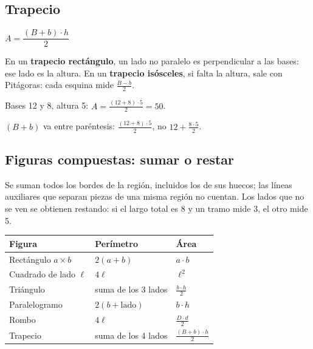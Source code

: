 \subsection{Trapecio}
\begin{clave}[Trapecio] $A = \dfrac{(B + b) \cdot h}{2}$\end{clave}
En un \textbf{trapecio rectángulo}, un lado no paralelo es perpendicular a las bases: ese lado es la altura. En un \textbf{trapecio isósceles}, si falta la altura, sale con Pitágoras: cada esquina mide $\frac{B - b}{2}$.
\begin{ejemplo} Bases 12 y 8, altura 5: $A = \frac{(12 + 8) \cdot 5}{2} = 50$.\end{ejemplo}
\begin{ojo} $(B + b)$ va entre paréntesis: $\frac{(12 + 8) \cdot 5}{2}$, no $12 + \frac{8 \cdot 5}{2}$.\end{ojo}

\subsection{Figuras compuestas: sumar o restar}
\begin{ojo} Se suman todos los bordes de la región, incluidos los de sus huecos; las líneas auxiliares que separan piezas de una misma región no cuentan. Los lados que no se ven se obtienen restando: si el largo total es 8 y un tramo mide 3, el otro mide 5.\end{ojo}
\begin{center}\small
\begin{tabular}{lll}\toprule
Figura & Perímetro & Área\\\midrule
Rectángulo $a \times b$ & $2(a + b)$ & $a \cdot b$\\
Cuadrado de lado $\ell$ & $4\ell$ & $\ell^2$\\
Triángulo & suma de los 3 lados & $\frac{b \cdot h}{2}$\\
Paralelogramo & $2(b + \text{lado})$ & $b \cdot h$\\
Rombo & $4\ell$ & $\frac{D \cdot d}{2}$\\
Trapecio & suma de los 4 lados & $\frac{(B + b) \cdot h}{2}$\\\bottomrule
\end{tabular}\end{center}

